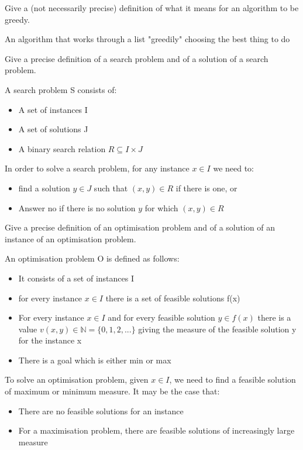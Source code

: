 \documentclass[addpoints]{exam}
\begin{document}
\begin{questions}
\question[2]Give a (not necessarily precise) definition of what it means for an algorithm to be greedy.
\begin{solution}[2in]
	An algorithm that works through a list "greedily" choosing the best thing to do
\end{solution}

\question[5]Give a precise definition of a search problem and of a solution of a
search problem.
\begin{solution}[2in]
	A search problem S consists of:
	\begin{itemize}
		\item A set of instances I
		\item A set of solutions J
		\item A binary search relation $R\subseteq I\times J$
	\end{itemize}
	In order to solve a search problem, for any instance $x\in I$ we need to:
	\begin{itemize}
		\item find a solution $y\in J$ such that $(x,y)\in R$ if there is one, or
		\item Answer no if there is no solution $y$ for which $(x,y)\in R$
	\end{itemize}
\end{solution}

\question[5]Give a precise definition of an optimisation problem and of a solution
of an instance of an optimisation problem.
\begin{solution}[2in]
	An optimisation problem O is defined as follows:
	\begin{itemize}
		\item It consists of a set of instances I
		\item for every instance $x\in I$ there is a set of feasible solutions f(x)
		\item For every instance $x\in I$ and for every feasible solution $y\in f(x)$ there is a value $v(x,y)\in \mathbb{N}=\{0,1,2,...\}$ giving the measure of the feasible solution y for the instance x
		\item There is a goal which is either min or max
	\end{itemize}
	To solve an optimisation problem, given $x\in I$, we need to find a feasible solution of maximum or minimum measure. It may be the case that:
	\begin{itemize}
		\item There are no feasible solutions for an instance
		\item For a maximisation problem, there are feasible solutions of increasingly large measure
	\end{itemize}
\end{solution}


\end{questions}
\end{document}
